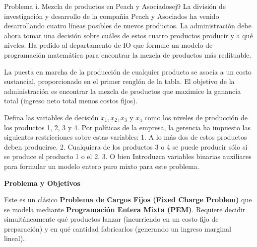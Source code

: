 \documentclass[10pt,a4paper]{article}
\begin{document}
\begin{ejercicio}{Problema i. Mezcla de productos en Peach y Asociados}{ej9}
La división de investigación y desarrollo de la compañía Peach y Asociados ha venido desarrollando cuatro líneas posibles de nuevos productos. La administración debe ahora tomar una decisión sobre cuáles de estos cuatro productos producir y a qué niveles. Ha pedido al departamento de IO que formule un modelo de programación matemática para encontrar la mezcla de productos más redituable. 

La puesta en marcha de la producción de cualquier producto se asocia a un costo sustancial, proporcionado en el primer renglón de la tabla. El objetivo de la administración es encontrar la mezcla de productos que maximice la ganancia total (ingreso neto total menos costos fijos).

\begin{center}
\end{center}

Defina las variables de decisión $x_1, x_2, x_3$ y $x_4$ como los niveles de producción de los productos 1, 2, 3 y 4. Por políticas de la empresa, la gerencia ha impuesto las siguientes restricciones sobre estas variables:
1. A lo más dos de estos productos deben producirse.
2. Cualquiera de los productos 3 o 4 se puede producir sólo si se produce el producto 1 o el 2.
3. O bien
Introduzca variables binarias auxiliares para formular un modelo entero puro mixto para este problema.
\end{ejercicio}

\vspace{3mm}
\textbf{Problema y Objetivos}

Este es un clásico \textbf{Problema de Cargos Fijos (Fixed Charge Problem)} que se modela mediante \textbf{Programación Entera Mixta (PEM)}. Requiere decidir simultáneamente qué productos lanzar (incurriendo en un costo fijo de preparación) y en qué cantidad fabricarlos (generando un ingreso marginal lineal).
\end{document}
